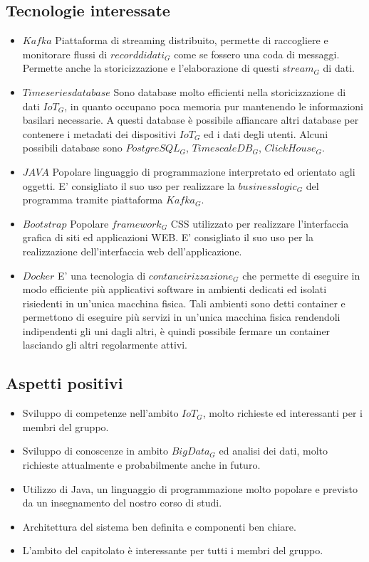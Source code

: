 \subsection{Tecnologie interessate}
\begin{itemize}
	\item $Kafka$ Piattaforma di streaming distribuito, permette di raccogliere e monitorare flussi di $record di dati_G$ come se fossero una coda di messaggi. Permette anche la storicizzazione e l'elaborazione di questi $stream_G$ di dati.	
	\item $Time series database$ Sono database molto efficienti nella storicizzazione di dati $IoT_G$, in quanto occupano poca memoria pur mantenendo le informazioni basilari necessarie. A questi database è possibile affiancare altri database per contenere i metadati dei dispositivi $IoT_G$ ed i dati degli utenti. Alcuni possibili database sono $PostgreSQL_G$, $TimescaleDB_G$, $ClickHouse_G$.
	\item $JAVA$ Popolare linguaggio di programmazione interpretato ed orientato agli oggetti. E' consigliato il suo uso per realizzare la $business logic_G$ del programma tramite piattaforma $Kafka_G$.
	\item $Bootstrap$ Popolare $framework_G$ CSS utilizzato per realizzare l'interfaccia grafica di siti ed applicazioni WEB. E' consigliato il suo uso per la realizzazione dell'interfaccia web dell'applicazione.
	\item $Docker$ E' una tecnologia di $contaneirizzazione_G$ che permette di eseguire in modo efficiente più applicativi software in ambienti dedicati ed isolati risiedenti in un'unica macchina fisica. Tali ambienti sono detti container e permettono di eseguire più servizi in un'unica macchina fisica rendendoli indipendenti gli uni dagli altri, è quindi possibile fermare un container lasciando gli altri regolarmente attivi.
\end{itemize} 
\subsection{Aspetti positivi}
\begin{itemize} 
	\item Sviluppo di competenze nell'ambito $IoT_G$, molto richieste ed interessanti per i membri del gruppo.
	\item Sviluppo di conoscenze in ambito $Big Data_G$ ed analisi dei dati, molto richieste attualmente e probabilmente anche in futuro.
	\item Utilizzo di Java, un linguaggio di programmazione molto popolare e previsto da un insegnamento del nostro corso di studi.
	\item Architettura del sistema ben definita e componenti ben chiare.
	\item L'ambito del capitolato è interessante per tutti i membri del gruppo.
\end{itemize}
